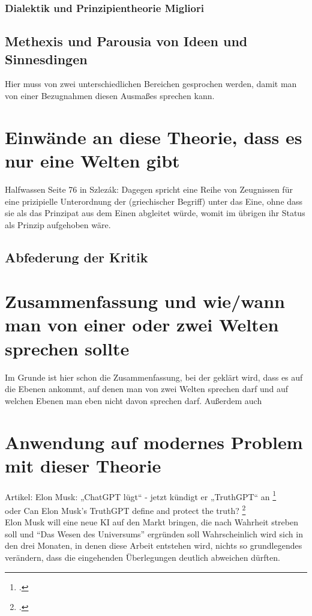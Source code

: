 \documentclass[12pt]{article}
\begin{document}
\subsubsection*{Dialektik und Prinzipientheorie Migliori}

\subsection{Methexis und Parousia von Ideen und Sinnesdingen}
Hier muss von zwei unterschiedlichen Bereichen gesprochen werden, damit man von einer Bezugnahmen diesen Ausmaßes sprechen kann. 
\section{Einwände an diese Theorie, dass es nur eine Welten gibt}
Halfwassen Seite 76 in Szlezák: Dagegen spricht eine Reihe von Zeugnissen für eine prizipielle Unterordnung der (griechischer Begriff) unter das Eine, ohne dass sie als das Prinzipat aus dem Einen abgleitet würde, womit im übrigen ihr Status als Prinzip aufgehoben wäre.
\subsection{Abfederung der Kritik}
\section{Zusammenfassung und wie/wann man von einer oder zwei Welten sprechen sollte}
Im Grunde ist hier schon die Zusammenfassung, bei der geklärt wird, dass es auf die Ebenen ankommt, auf denen man von zwei Welten sprechen darf und auf welchen Ebenen man eben nicht davon sprechen darf. Außerdem auch 

\section{Anwendung auf modernes Problem mit dieser Theorie}
Artikel: Elon Musk: „ChatGPT lügt“ - jetzt kündigt er „TruthGPT“ an \footcite[][]{MuskTruthGPTFokus}\\
oder Can Elon Musk’s TruthGPT define and protect the truth? \footcite[][]{MuskTruthGPTReuters}\\
Elon Musk will eine neue KI auf den Markt bringen, die nach Wahrheit streben soll und \enquote{Das Wesen des Universums} ergründen soll
Wahrscheinlich wird sich in den drei Monaten, in denen diese Arbeit entstehen wird, nichts so grundlegendes verändern, dass die eingehenden Überlegungen deutlich abweichen dürften. 
\end{document}
